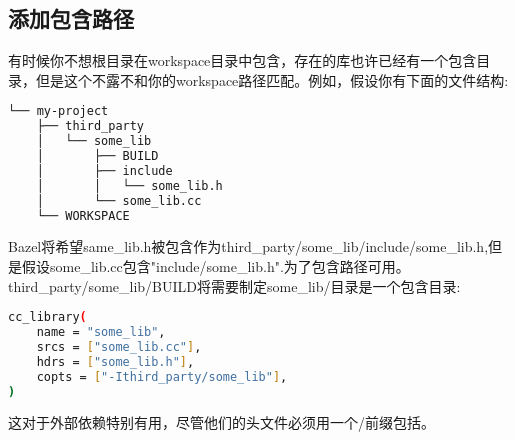 \subsection{添加包含路径}
有时候你不想根目录在workspace目录中包含，存在的库也许已经有一个包含目录，但是这个不露不和你的workspace路径匹配。例如，假设你有下面的文件结构:
\begin{lstlisting}[language=Bash]
└── my-project
    ├── third_party
    │   └── some_lib
    │       ├── BUILD
    │       ├── include
    │       │   └── some_lib.h
    │       └── some_lib.cc
    └── WORKSPACE
\end{lstlisting}
Bazel将希望same\_lib.h被包含作为third\_party/some\_lib/include/some\_lib.h,但是假设some\_lib.cc包含"include/some\_lib.h".为了包含路径可用。third\_party/some\_lib/BUILD将需要制定some\_lib/目录是一个包含目录:
\begin{lstlisting}[language=Bash]
cc_library(
    name = "some_lib",
    srcs = ["some_lib.cc"],
    hdrs = ["some_lib.h"],
    copts = ["-Ithird_party/some_lib"],
)
\end{lstlisting}
这对于外部依赖特别有用，尽管他们的头文件必须用一个/前缀包括。
